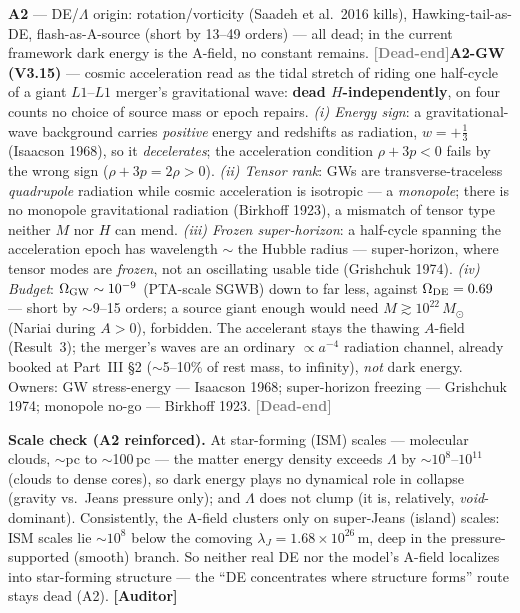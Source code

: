 \documentclass[11pt]{article}
\newcommand{\Auditor}{\textbf{\textcolor{teal!55!black}{[Auditor]}}}
\newcommand{\dead}{\textcolor{gray}{\textbf{[Dead-end]}}}
\newcommand{\msun}{M_\odot}
\begin{document}
\textbf{A2} --- DE/$\Lambda$ origin: rotation/vorticity (Saadeh et al.\ 2016 kills), Hawking-tail-as-DE, flash-as-A-source (short by 13--49 orders) --- all dead; in the current framework dark energy is the A-field, no constant remains. \dead\quad \textbf{A2-GW (V3.15)} --- cosmic acceleration read as the tidal stretch of riding one half-cycle of a giant $L1$--$L1$ merger's gravitational wave: \textbf{dead $H$-independently}, on four counts no choice of source mass or epoch repairs. \emph{(i) Energy sign}: a gravitational-wave background carries \emph{positive} energy and redshifts as radiation, $w=+\tfrac13$ (Isaacson 1968), so it \emph{decelerates}; the acceleration condition $\rho+3p<0$ fails by the wrong sign ($\rho+3p=2\rho>0$). \emph{(ii) Tensor rank}: GWs are transverse-traceless \emph{quadrupole} radiation while cosmic acceleration is isotropic --- a \emph{monopole}; there is no monopole gravitational radiation (Birkhoff 1923), a mismatch of tensor type neither $M$ nor $H$ can mend. \emph{(iii) Frozen super-horizon}: a half-cycle spanning the acceleration epoch has wavelength $\sim$ the Hubble radius --- super-horizon, where tensor modes are \emph{frozen}, not an oscillating usable tide (Grishchuk 1974). \emph{(iv) Budget}: $\Omega_{\rm GW}\sim10^{-9}$ (PTA-scale SGWB) down to far less, against $\Omega_{\rm DE}=0.69$ --- short by $\sim$9--15 orders; a source giant enough would need $M\gtrsim10^{22}\,\msun$ (Nariai during $A>0$), forbidden. The accelerant stays the thawing $A$-field (Result~3); the merger's waves are an ordinary $\propto a^{-4}$ radiation channel, already booked at Part~III \S2 ($\sim$5--10\% of rest mass, to infinity), \emph{not} dark energy. Owners: GW stress-energy --- Isaacson 1968; super-horizon freezing --- Grishchuk 1974; monopole no-go --- Birkhoff 1923. \dead\quad


\textbf{Scale check (A2 reinforced).} At star-forming (ISM) scales --- molecular clouds, $\sim$pc to $\sim$100\,pc --- the matter energy density exceeds $\Lambda$ by $\sim\!10^{8}$--$10^{11}$ (clouds to dense cores), so dark energy plays no dynamical role in collapse (gravity vs.\ Jeans pressure only); and $\Lambda$ does not clump (it is, relatively, \emph{void}-dominant). Consistently, the A-field clusters only on super-Jeans (island) scales: ISM scales lie $\sim\!10^{8}$ below the comoving $\lambda_J=1.68\times10^{26}$\,m, deep in the pressure-supported (smooth) branch. So neither real DE nor the model's A-field localizes into star-forming structure --- the ``DE concentrates where structure forms'' route stays dead (A2). \Auditor
\end{document}
